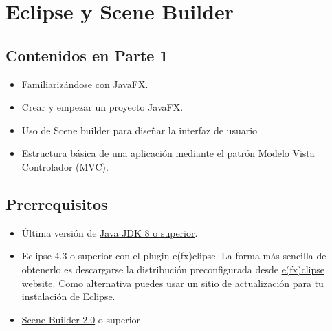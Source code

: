 \chapter{Eclipse y Scene Builder}
\section{Contenidos en Parte 1}
\begin{itemize}
	\item Familiarizándose con JavaFX.
	\item Crear y empezar un proyecto JavaFX.
	\item Uso de Scene builder para diseñar la interfaz de usuario
	\item Estructura básica de una aplicación mediante el patrón Modelo Vista Controlador (MVC).
\end{itemize}

\section{Prerrequisitos}
\begin{itemize}
	\item Última versión de \textcolor{azul}{\href{https://www.oracle.com/java/technologies/javase-downloads.html}{Java JDK 8 o superior}}.
	\item Eclipse 4.3 o superior con el plugin e(fx)clipse. La forma más sencilla de obtenerlo es descargarse la distribución preconfigurada desde \textcolor{azul}{\href{https://efxclipse.bestsolution.at/install.html\#all-in-one}{e(fx)clipse website}}. Como alternativa puedes usar un \textcolor{azul}{\href{https://www.eclipse.org/efxclipse/install.html}{sitio de actualización}} para tu instalación de Eclipse.
	\item \textcolor{azul}{\href{https://www.oracle.com/technetwork/java/javase/downloads/javafxscenebuilder-info-2157684.html}{Scene Builder 2.0}} o superior
\end{itemize}

